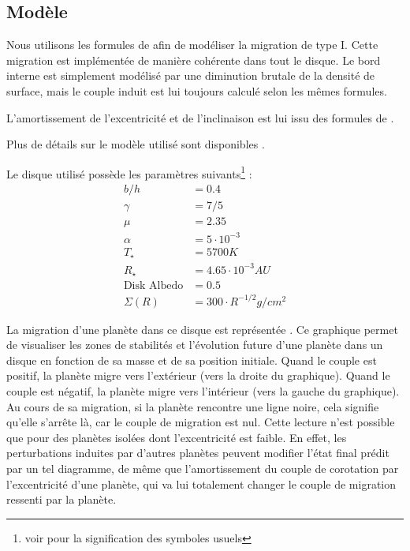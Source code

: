 \subsection{Modèle}
Nous utilisons les formules de \cite{paardekooper2011torque} afin de modéliser la migration de type I. Cette migration est implémentée de manière cohérente dans tout le disque. Le bord interne est simplement modélisé par une diminution brutale de la densité de surface, mais le couple induit est lui toujours calculé selon les mêmes formules. 

L'amortissement de l'excentricité et de l'inclinaison est lui issu des formules de \cite{cresswell2008three}. 

Plus de détails sur le modèle utilisé sont disponibles .

Le disque utilisé possède les paramètres suivants\footnote{voir  pour la signification des symboles usuels} : 
\begin{align*}
b/h &= 0.4\\
\gamma &= 7/5\\
\mu &= 2.35\\
\alpha &= 5\cdot 10^{-3}\\
T_\star &= 5700\unit{K}\\
R_\star &= 4.65\cdot 10^{-3}\unit{AU}\\
\text{Disk Albedo} &= 0.5\\
\Sigma(R) &= 300 \cdot R^{-1/2}\unit{g/cm^2}
\end{align*}

La migration d'une planète dans ce disque est représentée . Ce graphique permet de visualiser les zones de stabilités et l'évolution future d'une planète dans un disque en fonction de sa masse et de sa position initiale. Quand le couple est positif, la planète migre vers l'extérieur (vers la droite du graphique). Quand le couple est négatif, la planète migre vers l'intérieur (vers la gauche du graphique). Au cours de sa migration, si la planète rencontre une ligne noire, cela signifie qu'elle s'arrête là, car le couple de migration est nul. Cette lecture n'est possible que pour des planètes isolées dont l'excentricité est faible. En effet, les perturbations induites par d'autres planètes peuvent modifier l'état final prédit par un tel diagramme, de même que l'amortissement du couple de corotation par l'excentricité d'une planète, qui va lui totalement changer le couple de migration ressenti par la planète. 

